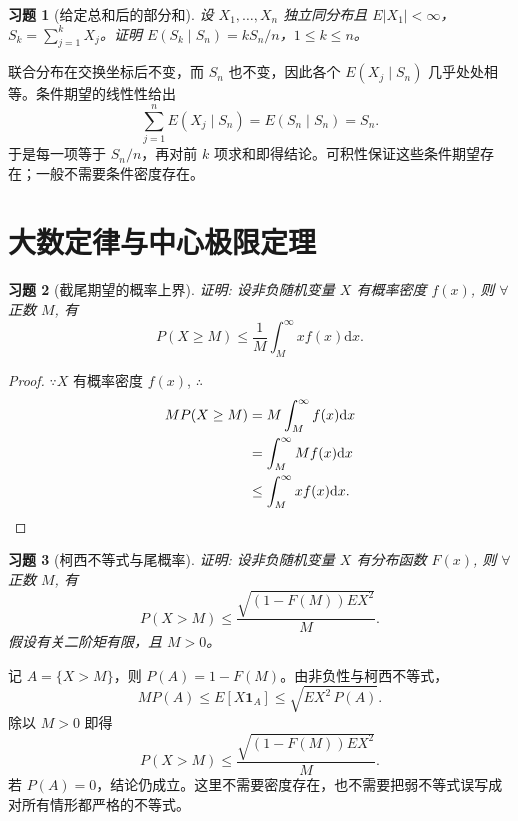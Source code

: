 \documentclass[UTF8,12pt,a4paper,fontset=fandol]{ctexart}
\newtheorem{exercise}{习题}[section]
\begin{document}
\begin{exercise}[给定总和后的部分和]\label{q:A6.35}
设 $X_1,\ldots,X_n$ 独立同分布且 $E|X_1|<\infty$，$S_k=\sum_{j=1}^kX_j$。证明 $E(S_k\mid S_n)=kS_n/n$，$1\le k\le n$。\par{}
\end{exercise}

\begin{solve}\label{a:A6.35}联合分布在交换坐标后不变，而 $S_n$ 也不变，因此各个 $E(X_j\mid S_n)$ 几乎处处相等。条件期望的线性性给出\[\sum_{j=1}^nE(X_j\mid S_n)=E(S_n\mid S_n)=S_n.\]于是每一项等于 $S_n/n$，再对前 $k$ 项求和即得结论。可积性保证这些条件期望存在；一般不需要条件密度存在。\end{solve}

\clearpage\section{大数定律与中心极限定理}

\begin{exercise}[截尾期望的概率上界]\label{q:A7.2}
证明: 设非负随机变量 $X$ 有概率密度 $f(x)$, 则 $\forall$ 正数 $M$, 有
    \[P(X\geq M)\leq\dfrac{1}{M}\int_M^\infty xf(x)\mathrm{d}x.\]\par{}
\end{exercise}

\begin{proof}\label{a:A7.2}
    $\because X$ 有概率密度 $f(x)$, $\therefore$
    \begin{align*}
        MP(X\geq M) & =M\int_M^\infty f(x)\mathrm{d}x \\
        & =\int_M^\infty Mf(x)\mathrm{d}x \\
        & \leq\int_M^\infty xf(x)\mathrm{d}x.\qedhere
    \end{align*}
\end{proof}

\begin{exercise}[柯西不等式与尾概率]\label{q:A7.3}
证明: 设非负随机变量 $X$ 有分布函数 $F(x)$, 则 $\forall$ 正数 $M$, 有
    \[P(X>M)\leq\dfrac{\sqrt{(1-F(M))EX^2}}{M}.\] 假设有关二阶矩有限，且 $M>0$。\par{}
\end{exercise}

\begin{solve}\label{a:A7.3}记 $A=\{X>M\}$，则 $P(A)=1-F(M)$。由非负性与柯西不等式，\[MP(A)\le E[X\mathbf1_A]\le\sqrt{EX^2\,P(A)}.\]除以 $M>0$ 即得\[P(X>M)\le\frac{\sqrt{(1-F(M))EX^2}}M.\]若 $P(A)=0$，结论仍成立。这里不需要密度存在，也不需要把弱不等式误写成对所有情形都严格的不等式。\end{solve}
\end{document}
